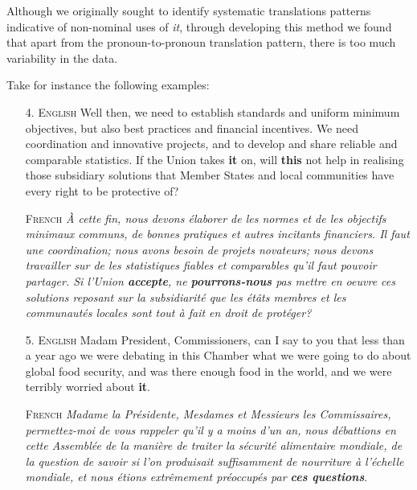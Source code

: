 \documentclass[10pt, a4paper]{article}
\begin{document}



Although we originally sought to identify systematic translations patterns 
indicative of non-nominal uses of \textit{it}, through 
developing this method we found that apart from the pronoun-to-pronoun 
translation pattern, there is too much variability in the data. 

Take for instance the following examples:


\begin{enumerate}

\item[4.]\label{ex:freetrans} 
\textsc{English} Well then, we need to establish standards and uniform minimum 
objectives, but also best practices and financial incentives. We need 
coordination and innovative projects, and to develop and share reliable and 
comparable statistics. If the Union takes \textbf{it} on, will \textbf{this} not help in 
realising those subsidiary solutions that Member States and local communities 
have every right to be protective of? 

\textsc{French} \textit{À cette fin, nous devons élaborer de les normes et de 
les 
objectifs minimaux communs, de bonnes pratiques et autres incitants financiers. 
Il faut une coordination; nous avons besoin de projets novateurs; nous devons 
travailler sur de les statistiques fiables et comparables qu'il faut pouvoir 
partager. Si l'Union \textbf{accepte}, ne \textbf{pourrons-nous} pas mettre en oeuvre ces 
solutions reposant sur la subsidiarité que les étâts membres et les communautés 
locales sont tout à fait en droit de protéger?}


\item[5.]\label{ex:shellnoun}\textsc{English} Madam President, Commissioners, 
can I 
say to you that less than 
a year ago we were debating in this Chamber what we were going to do about 
global food security, and was there enough food in the world, and we were 
terribly worried about \textbf{it}.

\textsc{French} \textit{Madame la Présidente, Mesdames et Messieurs les 
Commissaires, permettez-moi de vous rappeler qu'il y a moins d'un an, nous 
débattions en cette Assemblée de la manière de traiter la sécurité alimentaire 
mondiale, de la question de savoir si l'on produisait suffisamment de 
nourriture à l'échelle mondiale, et nous étions extrêmement préoccupés par 
\textbf{ces questions}}.

\end{enumerate}
\end{document}
